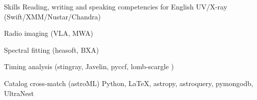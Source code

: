 
\begin{rubric}{Skills}
	Reading, writing and speaking competencies for English
	UV/X-ray (Swift/XMM/Nustar/Chandra)\par
	Radio imaging (VLA, MWA)
	
    Spectral fitting (heasoft, BXA)\par
    Timing analysis (stingray, Javelin, pyccf, lomb-scargle ) \par
    Catalog cross-match (astroML)
    Python,  \LaTeX, 
    astropy, astroquery, pymongodb, UltraNest
    
\end{rubric}
